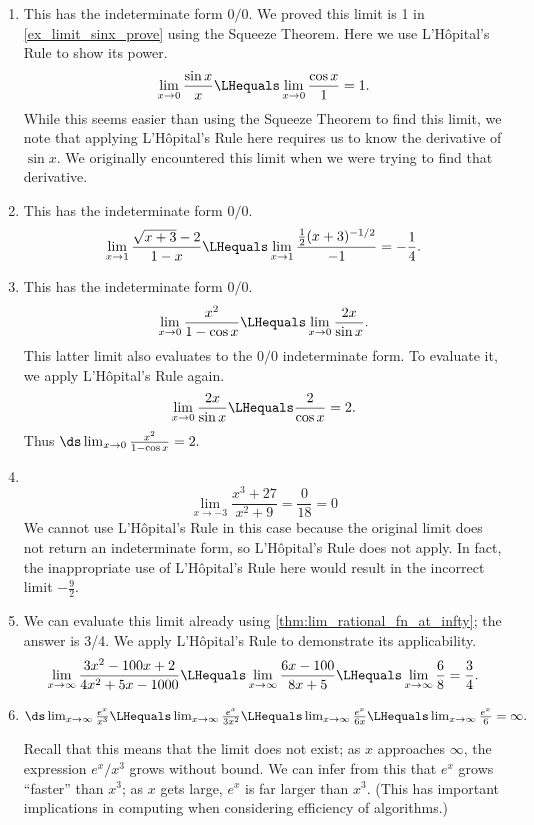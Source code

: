 {\begin{enumerate}
	\item	This has the indeterminate form $0/0$. We proved this limit is 1 in \autoref{ex_limit_sinx_prove} using the Squeeze Theorem. Here we use L'H\^opital's Rule to show its power.
\[\lim_{x\to0}\frac{\sin x}x \LHequals \lim_{x\to0} \frac{\cos x}{1}=1.\]
While this seems easier than using the Squeeze Theorem to find this limit, we note that applying L'H\^opital's Rule here requires us to know the derivative of $\sin x$. We originally encountered this limit when we were trying to find that derivative.

	\item	This has the indeterminate form $0/0$.
\[\lim_{x\to 1}\frac{\sqrt{x+3}-2}{1-x} 	 \LHequals \lim_{x \to 1} \frac{\frac12(x+3)^{-1/2}}{-1} =-\frac 14.\]

	\item	This has the indeterminate form $0/0$.
\[\lim_{x\to 0}\frac{x^2}{1-\cos x}  \LHequals  \lim_{x\to 0} \frac{2x}{\sin x}.\]
This latter limit also evaluates to the $0/0$ indeterminate form. To evaluate it, we apply L'H\^opital's Rule again.
\[
 \lim_{x\to 0} \frac{2x}{\sin x}
 \LHequals \frac{2}{\cos x} = 2 .
\]
Thus $\ds \lim_{x\to0}\frac{x^2}{1-\cos x}=2.$

	\item \mbox{}\\[-2\baselineskip]
\[\lim_{x\to-3}\frac{x^3+27}{x^2+9} =\frac 0{18}=0\]
We cannot use L'H\^opital's Rule in this case because the original limit does not return an indeterminate form, so L'H\^opital's Rule does not apply. In fact, the inappropriate use of L'H\^opital's Rule here would result in the incorrect limit $-\frac92$.

	\item	We can evaluate this limit already using \autoref{thm:lim_rational_fn_at_infty}; the answer is 3/4. We apply L'H\^opital's Rule to demonstrate its applicability.
\[
 \lim_{x\to\infty} \frac{3x^2-100x+2}{4x^2+5x-1000}
 \LHequals \lim_{x\to\infty} \frac{6x-100}{8x+5}
 \LHequals \lim_{x\to\infty} \frac68 = \frac34.
\]

	\item	$\ds\lim_{x\to \infty}\frac{e^x}{x^3} \LHequals \lim_{x\to\infty} \frac{e^x}{3x^2} \LHequals \lim_{x\to\infty} \frac{e^x}{6x} \LHequals \lim_{x\to\infty} \frac{e^x}{6} = \infty.$

Recall that this means that the limit does not exist; as $x$ approaches $\infty$, the expression $e^x/x^3$ grows without bound. We can infer from this that $e^x$ grows ``faster'' than $x^3$; as $x$ gets large, $e^x$ is far larger than $x^3$. (This has important implications in computing when considering efficiency of algorithms.)\eoehere
\end{enumerate}}

